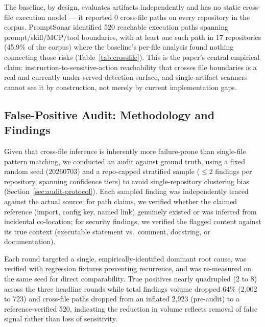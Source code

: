 \documentclass[sigconf,anonymous,review]{acmart}
\newcommand{\sysname}{PromptSonar}
\begin{document}


The baseline, by design, evaluates artifacts independently and has no static cross-file execution model --- it reported 0 cross-file paths on every repository in the corpus. \sysname{} identified 520 reachable execution paths spanning prompt/skill/MCP/tool boundaries, with at least one such path in 17 repositories (45.9\% of the corpus) where the baseline's per-file analysis found nothing connecting those risks (Table~\ref{tab:crossfile}). This is the paper's central empirical claim: instruction-to-sensitive-action reachability that crosses file boundaries is a real and currently under-served detection surface, and single-artifact scanners cannot see it by construction, not merely by current implementation gaps.

\subsection{False-Positive Audit: Methodology and Findings}
\label{sec:audit}
Given that cross-file inference is inherently more failure-prone than single-file pattern matching, we conducted an audit against ground truth, using a fixed random seed (20260703) and a repo-capped stratified sample ($\leq$2 findings per repository, spanning confidence tiers) to avoid single-repository clustering bias (Section~\ref{sec:audit-protocol}). Each sampled finding was independently traced against the actual source: for path claims, we verified whether the claimed reference (import, config key, named link) genuinely existed or was inferred from incidental co-location; for security findings, we verified the flagged content against its true context (executable statement vs.\ comment, docstring, or documentation).



Each round targeted a single, empirically-identified dominant root cause, was verified with regression fixtures preventing recurrence, and was re-measured on the same seed for direct comparability. True positives nearly quadrupled (2 to 8) across the three headline rounds while total findings volume dropped 64\% (2{,}002 to 723) and cross-file paths dropped from an inflated 2{,}923 (pre-audit) to a reference-verified 520, indicating the reduction in volume reflects removal of false signal rather than loss of sensitivity.
\end{document}
